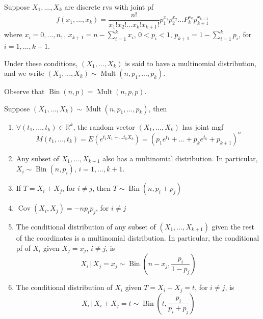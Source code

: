 \documentclass[notoc,notitlepage]{tufte-book}
\DeclareMathOperator{\Bin}{Bin }
\DeclareMathOperator{\Mult}{Mult }
\DeclareMathOperator{\Cov}{Cov }
\begin{document}
\begin{defn}
\label{defn:mutlinomial_distribution}
  Suppose $X_1, ..., X_k$ are discrete rvs with joint pf
  \begin{equation*}
    f(x_1, ..., x_k) = \frac{n!}{x_1! x_2! \hdots x_k! x_{k + 1}!} p_1^{x_1} p_2^{x_2} \hdots P_k^{x_k} p_{k + 1}^{x_{k + 1}}
  \end{equation*}
  where $x_i = 0, ..., n,$, $x_{k + 1} = n - \sum_{i=1}^{k} x_i$, $0 < p_i < 1$, $p_{k + 1} = 1 - \sum_{i=1}^{k} p_i$, for $i = 1, ..., k + 1$.

  Under these conditions, $(X_1, ..., X_k)$ is said to have a multinomial distribution, and we write $(X_1, ..., X_k) \sim \Mult(n, p_1, ..., p_k)$.
\end{defn}

\begin{note}
  Observe that $\Bin(n, p) = \Mult(n, p, p)$.
\end{note}

\begin{propo}
\label{propo:properties_of_multinomial_distribution}
  Suppose $(X_1, ..., X_k) \sim \Mult(n, p_1, ..., p_k)$, then
  \begin{enumerate}
    \item $\forall (t_1, ..., t_k) \in \mathbb{R}^k$, the random vector $(X_1, ..., X_k)$ has joint mgf
      \begin{equation*}
        M(t_1, ..., t_k) = E \left( e^{t_1 X_1 + \hdots t_k X_k} \right) = (p_1 e^{t_1} + \hdots + p_k e^{t_k} + p_{k + 1})^n
      \end{equation*}

    \item Any subset of $X_1, ..., X_{k + 1}$ also has a multinomial distribution. In particular, $X_i \sim \Bin(n, p_i), \, i = 1, ..., k + 1$.
    \item If $T = X_i + X_j$, for $i \neq j$, then $T \sim \Bin(n, p_i + p_j)$
    \item $\Cov(X_i, X_j) = -n p_i p_j$, for $i \neq j$
    \item The conditional distribution of any subset of $(X_1, ..., X_{k + 1})$ given the rest of the coordinates is a multinomial distribution. In particular, the conditional pf of $X_i$ given $X_j = x_j$, $i \neq j$, is
      \begin{equation*}
        X_i \, | \, X_j = x_j \sim \Bin\left( n - x_j, \frac{p_i}{1 - p_j} \right)
      \end{equation*}

    \item The conditional distribution of $X_i$ given $T = X_i + X_j = t$, for $i \neq j$, is
      \begin{equation*}
        X_i \, | \, X_i + X_j = t \sim \Bin \left( t, \frac{p_i}{p_i + p_j} \right)
      \end{equation*}
  \end{enumerate}
\end{propo}
\end{document}
